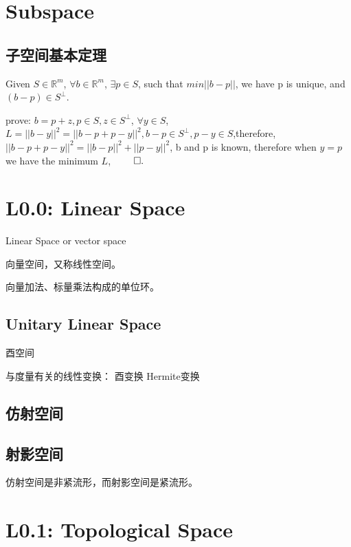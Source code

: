 \documentclass[UTF8]{../../09-Mathematics}
\begin{document}
\chapter{Subspace}

\section{子空间基本定理}

\begin{lemma}
    Given $S \in \mathbb R^m$, $\forall b \in \mathbb R^m$, $\exists p \in S$, such that $min ||b-p||$, we have p is unique, and $(b-p)\in S^ \bot $.

    prove: $b = p+z, p\in S, z \in S^ \bot$, $\forall y \in S$, $L= ||b-y||^2 = ||b-p+p-y||^2 ,b-p \in S^ \bot, p-y \in S$,therefore, $ ||b-p+p-y||^2= ||b-p||^2 + ||p-y||^2 $, b and p is known, therefore when $y=p$ we have the minimum $L$, $\qed.$
\end{lemma}



\chapter{L0.0: Linear Space}

Linear Space or vector space

向量空间，又称线性空间。


向量加法、标量乘法构成的单位环。




\section{Unitary Linear Space}

酉空间 


与度量有关的线性变换：
酉变换
Hermite变换


\section{仿射空间}


\section{射影空间}

仿射空间是非紧流形，而射影空间是紧流形。





\chapter{L0.1: Topological Space}
\end{document}
